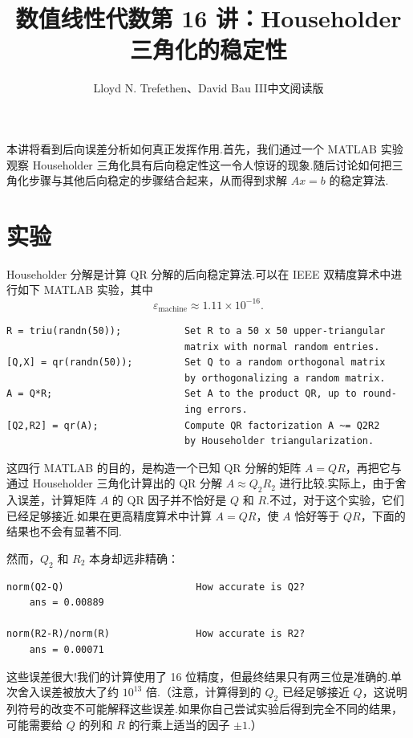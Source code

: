 \documentclass[UTF8,fontset=none,12pt]{ctexart}
\title{数值线性代数\quad 第 16 讲：Householder 三角化的稳定性}
\author{Lloyd N. Trefethen、David Bau III\quad 中文阅读版}
\date{}
\newcommand{\epsmach}{\varepsilon_{\mathrm{machine}}}
\theoremstyle{definition}
\begin{document}
\maketitle
\pagestyle{plain}

本讲将看到后向误差分析如何真正发挥作用.首先，我们通过一个 MATLAB 实验观察 Householder 三角化具有后向稳定性这一令人惊讶的现象.随后讨论如何把三角化步骤与其他后向稳定的步骤结合起来，从而得到求解 $Ax=b$ 的稳定算法.

\section*{实验}

Householder 分解是计算 QR 分解的后向稳定算法.可以在 IEEE 双精度算术中进行如下 MATLAB 实验，其中
\[
    \epsmach\approx1.11\times10^{-16}.
\]

\begin{verbatim}
R = triu(randn(50));           Set R to a 50 x 50 upper-triangular
                               matrix with normal random entries.
[Q,X] = qr(randn(50));         Set Q to a random orthogonal matrix
                               by orthogonalizing a random matrix.
A = Q*R;                       Set A to the product QR, up to round-
                               ing errors.
[Q2,R2] = qr(A);               Compute QR factorization A ~= Q2R2
                               by Householder triangularization.
\end{verbatim}

这四行 MATLAB 的目的，是构造一个已知 QR 分解的矩阵 $A=QR$，再把它与通过 Householder 三角化计算出的 QR 分解 $A\approx Q_2R_2$ 进行比较.实际上，由于舍入误差，计算矩阵 $A$ 的 QR 因子并不恰好是 $Q$ 和 $R$.不过，对于这个实验，它们已经足够接近.如果在更高精度算术中计算 $A=QR$，使 $A$ 恰好等于 $QR$，下面的结果也不会有显著不同.

然而，$Q_2$ 和 $R_2$ 本身却远非精确：

\begin{verbatim}
norm(Q2-Q)                       How accurate is Q2?
    ans = 0.00889

norm(R2-R)/norm(R)               How accurate is R2?
    ans = 0.00071
\end{verbatim}

这些误差很大!我们的计算使用了 16 位精度，但最终结果只有两三位是准确的.单次舍入误差被放大了约 $10^{13}$ 倍.（注意，计算得到的 $Q_2$ 已经足够接近 $Q$，这说明列符号的改变不可能解释这些误差.如果你自己尝试实验后得到完全不同的结果，可能需要给 $Q$ 的列和 $R$ 的行乘上适当的因子 $\pm1$.）
\end{document}
